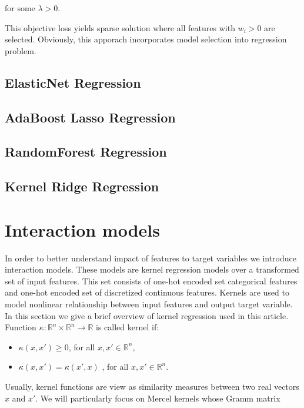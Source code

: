 \documentclass{article}
\begin{document}
for some $\lambda>0$.


This objective loss yields sparse solution where all features with $w_i>0$ are selected. Obviously, this apporach incorporates model selection into regression problem.

\subsection{ElasticNet Regression}

\subsection{AdaBoost Lasso Regression}

\subsection{RandomForest Regression}

\subsection{Kernel Ridge Regression}



\section{Interaction models}
In order to better understand impact of features to target variables we introduce interaction models. These models are kernel regression models over a transformed set of input features. This set consists of one-hot encoded set categorical features and one-hot encoded set of discretized continuous features. Kernels are used to model nonlinear relationship between input features and output target variable. In this section we give a brief overview of kernel regression used in this article.
Function $\kappa:\mathbb{R}^{n}\times\mathbb{R}^n\rightarrow\mathbb{R}$ is called kernel if:
\begin{itemize}
  \item $\kappa(x,x')\geq 0$, for all $x,x'\in \mathbb{R}^n$,
  \item $\kappa(x,x') = \kappa(x',x)$ , for all $x,x'\in \mathbb{R}^n$.
\end{itemize}

Usually, kernel functions are view as similarity measures between two real vectors $x$ and $x'$. We will particularly focus on Mercel kernels whose Gramm matrix 
\end{document}
